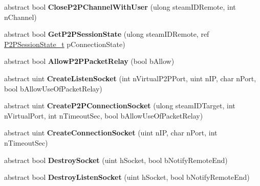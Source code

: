 \begin{DoxyCompactItemize}
abstract bool {\bfseries Close\+P2\+P\+Channel\+With\+User} (ulong steam\+I\+D\+Remote, int n\+Channel)
\item 
\mbox{\label{class_valve_1_1_steamworks_1_1_i_steam_networking_a80398c441c26657f7ac4f0e2173b6c31}} 
abstract bool {\bfseries Get\+P2\+P\+Session\+State} (ulong steam\+I\+D\+Remote, ref \hyperlink{struct_valve_1_1_steamworks_1_1_p2_p_session_state__t}{P2\+P\+Session\+State\+\_\+t} p\+Connection\+State)
\item 
\mbox{\label{class_valve_1_1_steamworks_1_1_i_steam_networking_adc1e5d85e029e4a55042f218d963108f}} 
abstract bool {\bfseries Allow\+P2\+P\+Packet\+Relay} (bool b\+Allow)
\item 
\mbox{\label{class_valve_1_1_steamworks_1_1_i_steam_networking_a0ddc9d2254967d89c9838857de5ad243}} 
abstract uint {\bfseries Create\+Listen\+Socket} (int n\+Virtual\+P2\+P\+Port, uint n\+IP, char n\+Port, bool b\+Allow\+Use\+Of\+Packet\+Relay)
\item 
\mbox{\label{class_valve_1_1_steamworks_1_1_i_steam_networking_a1cd6430a404879d28e7c0b9c4ca706cd}} 
abstract uint {\bfseries Create\+P2\+P\+Connection\+Socket} (ulong steam\+I\+D\+Target, int n\+Virtual\+Port, int n\+Timeout\+Sec, bool b\+Allow\+Use\+Of\+Packet\+Relay)
\item 
\mbox{\label{class_valve_1_1_steamworks_1_1_i_steam_networking_a2eb17da3d3d3d423cdcd20d8bc2b788a}} 
abstract uint {\bfseries Create\+Connection\+Socket} (uint n\+IP, char n\+Port, int n\+Timeout\+Sec)
\item 
\mbox{\label{class_valve_1_1_steamworks_1_1_i_steam_networking_a7f98a6261ed4cdd20deadb65082133da}} 
abstract bool {\bfseries Destroy\+Socket} (uint h\+Socket, bool b\+Notify\+Remote\+End)
\item 
\mbox{\label{class_valve_1_1_steamworks_1_1_i_steam_networking_aa20e814e8d0ecd4aa6d8521da91a7e81}} 
abstract bool {\bfseries Destroy\+Listen\+Socket} (uint h\+Socket, bool b\+Notify\+Remote\+End)

\end{DoxyCompactItemize}
